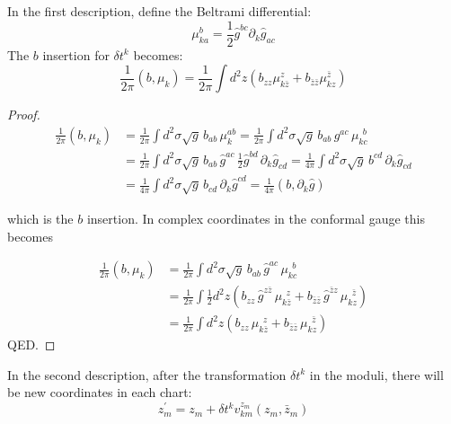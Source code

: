 In the first description, define the Beltrami differential:
\begin{equation}
	\mu_{k a}^{b}=\frac{1}{2} \hat{g}^{b c} \partial_{k} \hat{g}_{a c}\label{5.4.7}
\end{equation}
The $b$ insertion for $\delta t^{k}$ becomes:
\begin{equation}
	\frac{1}{2 \pi}\left(b, \mu_{k}\right)=\frac{1}{2 \pi} \int d^{2} z\left(b_{z z} \mu_{k \bar{z}}^{z}+b_{\bar{z} \bar{z}} \mu_{k z}^{\bar{z}}\right)\label{5.4.8}
\end{equation}
\begin{tcolorbox}[breakable]
	\begin{proof}
		\begin{align}
			\frac{1}{2\pi}(b,\mu_k)
			&= \frac{1}{2\pi} \int d^2\sigma \sqrt{g}\, b_{ab}\,\mu_k^{ab}
			= \frac{1}{2\pi} \int d^2\sigma \sqrt{g}\, b_{ab}\, g^{ac}\,\mu_{kc}^{\ \ b}\nonumber \\
			&= \frac{1}{2\pi} \int d^2\sigma \sqrt{g}\, b_{ab}\, \hat g^{ac}\,\frac{1}{2}\hat g^{bd}\,\partial_k \hat g_{cd}
			= \frac{1}{4\pi} \int d^2\sigma \sqrt{g}\, b^{cd}\,\partial_k \hat g_{cd}\nonumber \\
			&= \frac{1}{4\pi} \int d^2\sigma \sqrt{g}\, b_{cd}\,\partial_k \hat g^{cd}
			= \frac{1}{4\pi} (b, \partial_k \hat g)
		\end{align}
		
		which is the $b$ insertion. In complex coordinates in the conformal gauge this becomes
		
		\begin{align}
			\frac{1}{2\pi}(b,\mu_k)
			&= \frac{1}{2\pi} \int d^2\sigma \sqrt{g}\, b_{ab}\,\hat g^{ac}\,\mu_{kc}^{\ \ b}\nonumber \\
			&= \frac{1}{2\pi} \int \frac{1}{2} d^2 z \left(
			b_{zz}\,\hat g^{z\bar z}\,\mu_{k\bar z}^{\ \ z}
			+ b_{\bar z\bar z}\,\hat g^{\bar z z}\,\mu_{k z}^{\ \ \bar z}
			\right) \nonumber\\
			&= \frac{1}{2\pi} \int d^2 z \left(
			b_{zz}\,\mu_{k\bar z}^{\ \ z}
			+ b_{\bar z\bar z}\,\mu_{k z}^{\ \ \bar z}
			\right)
		\end{align}
		QED.
	\end{proof}
\end{tcolorbox}
In the second description, after the transformation $\delta t^{k}$ in the moduli, there will be new coordinates in each chart:
\begin{equation}
	z_{m}^{\prime}=z_{m}+\delta t^{k} v_{k m}^{z_{m}}\left(z_{m}, \bar{z}_{m}\right)\label{5.4.9}
\end{equation}
